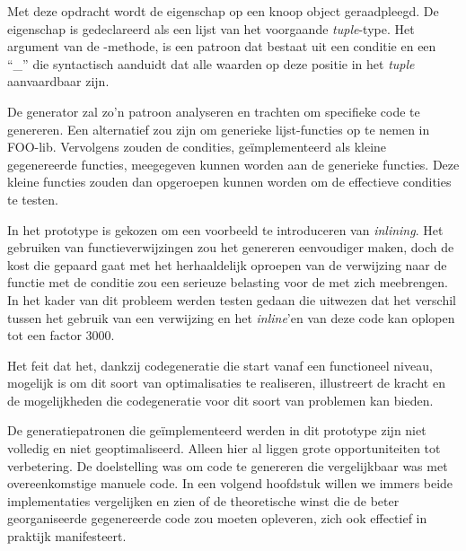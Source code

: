Met deze opdracht wordt de eigenschap  op een knoop object
geraadpleegd. De eigenschap is gedeclareerd als een lijst van het voorgaande
\emph{tuple}-type. Het argument van de -methode, is een patroon dat
bestaat uit een conditie  en een ``\_'' die syntactisch aanduidt
dat alle waarden op deze positie in het \emph{tuple} aanvaardbaar zijn.

De generator zal zo'n patroon analyseren en trachten om specifieke code te
genereren. Een alternatief zou zijn om generieke lijst-functies op te nemen in
FOO-lib. Vervolgens zouden de condities, ge\"implementeerd als kleine
gegenereerde functies, meegegeven kunnen worden aan de generieke functies. Deze
kleine functies zouden dan opgeroepen kunnen worden om de effectieve condities
te testen.

In het prototype is gekozen om een voorbeeld te introduceren van
\emph{inlining}. Het gebruiken van functieverwijzingen zou het genereren
eenvoudiger maken, doch de kost die gepaard gaat met het herhaaldelijk oproepen
van de verwijzing naar de functie met de conditie zou een serieuze belasting
voor de \mcu met zich meebrengen. In het kader van dit probleem werden testen
gedaan die uitwezen dat het verschil tussen het gebruik van een verwijzing en
het \emph{inline}'en van deze code kan oplopen tot een factor 3000.

\vspace{5mm}

Het feit dat het, dankzij codegeneratie die start vanaf een functioneel niveau,
mogelijk is om dit soort van optimalisaties te realiseren, illustreert de
kracht en de mogelijkheden die codegeneratie voor dit soort van problemen kan
bieden.

De generatiepatronen die ge\"implementeerd werden in dit prototype zijn niet
volledig en niet geoptimaliseerd. Alleen hier al liggen grote opportuniteiten
tot verbetering. De doelstelling was om code te genereren die vergelijkbaar was
met overeenkomstige manuele code. In een volgend hoofdstuk willen we immers
beide implementaties vergelijken en zien of de theoretische winst die de beter
georganiseerde gegenereerde code zou moeten opleveren, zich ook effectief in
praktijk manifesteert.
